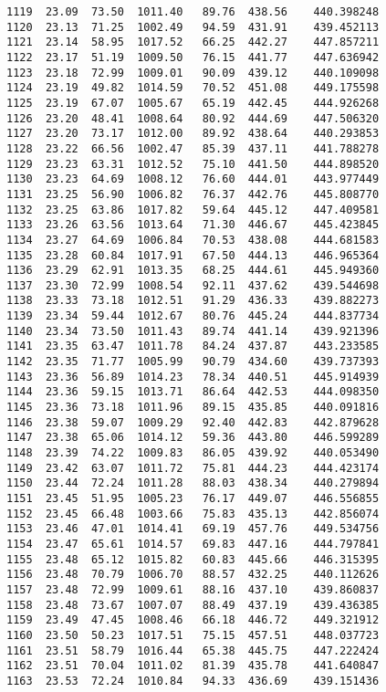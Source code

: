 \documentclass[11pt]{article}
\begin{document}
\begin{tcolorbox}[breakable, size=fbox, boxrule=.5pt, pad at break*=1mm, opacityfill=0]
\begin{Verbatim}[commandchars=\\\{\}]
1119  23.09  73.50  1011.40   89.76  438.56    440.398248
1120  23.13  71.25  1002.49   94.59  431.91    439.452113
1121  23.14  58.95  1017.52   66.25  442.27    447.857211
1122  23.17  51.19  1009.50   76.15  441.77    447.636942
1123  23.18  72.99  1009.01   90.09  439.12    440.109098
1124  23.19  49.82  1014.59   70.52  451.08    449.175598
1125  23.19  67.07  1005.67   65.19  442.45    444.926268
1126  23.20  48.41  1008.64   80.92  444.69    447.506320
1127  23.20  73.17  1012.00   89.92  438.64    440.293853
1128  23.22  66.56  1002.47   85.39  437.11    441.788278
1129  23.23  63.31  1012.52   75.10  441.50    444.898520
1130  23.23  64.69  1008.12   76.60  444.01    443.977449
1131  23.25  56.90  1006.82   76.37  442.76    445.808770
1132  23.25  63.86  1017.82   59.64  445.12    447.409581
1133  23.26  63.56  1013.64   71.30  446.67    445.423845
1134  23.27  64.69  1006.84   70.53  438.08    444.681583
1135  23.28  60.84  1017.91   67.50  444.13    446.965364
1136  23.29  62.91  1013.35   68.25  444.61    445.949360
1137  23.30  72.99  1008.54   92.11  437.62    439.544698
1138  23.33  73.18  1012.51   91.29  436.33    439.882273
1139  23.34  59.44  1012.67   80.76  445.24    444.837734
1140  23.34  73.50  1011.43   89.74  441.14    439.921396
1141  23.35  63.47  1011.78   84.24  437.87    443.233585
1142  23.35  71.77  1005.99   90.79  434.60    439.737393
1143  23.36  56.89  1014.23   78.34  440.51    445.914939
1144  23.36  59.15  1013.71   86.64  442.53    444.098350
1145  23.36  73.18  1011.96   89.15  435.85    440.091816
1146  23.38  59.07  1009.29   92.40  442.83    442.879628
1147  23.38  65.06  1014.12   59.36  443.80    446.599289
1148  23.39  74.22  1009.83   86.05  439.92    440.053490
1149  23.42  63.07  1011.72   75.81  444.23    444.423174
1150  23.44  72.24  1011.28   88.03  438.34    440.279894
1151  23.45  51.95  1005.23   76.17  449.07    446.556855
1152  23.45  66.48  1003.66   75.83  435.13    442.856074
1153  23.46  47.01  1014.41   69.19  457.76    449.534756
1154  23.47  65.61  1014.57   69.83  447.16    444.797841
1155  23.48  65.12  1015.82   60.83  445.66    446.315395
1156  23.48  70.79  1006.70   88.57  432.25    440.112626
1157  23.48  72.99  1009.61   88.16  437.10    439.860837
1158  23.48  73.67  1007.07   88.49  437.19    439.436385
1159  23.49  47.45  1008.46   66.18  446.72    449.321912
1160  23.50  50.23  1017.51   75.15  457.51    448.037723
1161  23.51  58.79  1016.44   65.38  445.75    447.222424
1162  23.51  70.04  1011.02   81.39  435.78    441.640847
1163  23.53  72.24  1010.84   94.33  436.69    439.151436

\end{Verbatim}
\end{tcolorbox}
\end{document}
